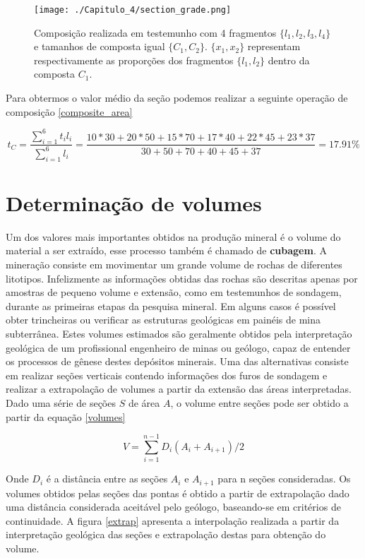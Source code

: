 \FloatBarrier
\begin{figure}[!htpb]
	\centering
	\texttt{[image: ./Capitulo\_4/section\_grade.png]}	
	\caption{Composição realizada em testemunho com 4 fragmentos $\{l_{1},l_{2},l_{3},l_{4}\}$ e tamanhos de composta igual  $\{C_{1},C_{2}\}$. $\{x_{1},x_{2}\}$ representam respectivamente as proporções dos fragmentos $\{l_{1},l_{2}\}$ dentro da composta $C_{1}$.  }
	\label{composicao2}
\end{figure}
\FloatBarrier       

Para obtermos o valor médio da seção podemos realizar a seguinte operação de composição \eqref{composite_area}

\begin{equation} \label{composite_area} 
t_{C} = \frac{\sum_{i=1}^{6}t_{i}l_{i}}{\sum_{i=1}^{6}l_{i}} = \frac{10*30 + 20*50 + 15*70 + 17*40 + 22*45 + 23*37}{30+50+70+40+45+37}=17.91\%
\end{equation}

\section{Determinação de volumes} 

Um dos valores mais importantes obtidos na produção mineral é o volume do material a ser extraído, esse processo também é chamado de \textbf{cubagem}. A mineração consiste em movimentar um grande volume de rochas de diferentes litotipos. Infelizmente as informações obtidas das rochas são descritas apenas por amostras de pequeno volume e extensão, como em testemunhos de sondagem, durante as primeiras etapas da pesquisa mineral. Em alguns casos é possível obter trincheiras ou verificar as estruturas geológicas em painéis de mina subterrânea. Estes volumes estimados são geralmente obtidos pela interpretação geológica de um profissional engenheiro de minas ou geólogo, capaz de entender os processos de gênese destes depósitos minerais. Uma das alternativas consiste em realizar seções verticais contendo informações dos furos de sondagem e realizar a extrapolação de volumes a partir da extensão das áreas interpretadas. Dado uma série de seções $S$ de área $A$, o volume entre seções pode ser obtido a partir da equação \eqref{volumes}

\begin{equation} \label{volumes}
	V = \sum_{i=1}^{n-1}D_{i}(A_{i} + A_{i+1})/2
\end{equation}

Onde $D_{i}$ é a distância entre as seções $A_{i}$ e $A_{i+1}$ para n seções consideradas. Os volumes obtidos pelas seções das pontas é obtido a partir de extrapolação dado uma distância considerada aceitável pelo geólogo, baseando-se em critérios de continuidade. A figura \ref{extrap} apresenta a interpolação realizada a partir da interpretação geológica das seções e extrapolação destas para obtenção do volume.

